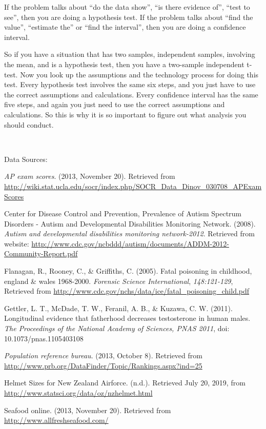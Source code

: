 \documentclass[
]{book}
\begin{document}
If the problem talks about ``do the data show'', ``is there evidence of'', ``test to see'', then you are doing a hypothesis test. If the problem talks about ``find the value'', ``estimate the'' or ``find the interval'', then you are doing a confidence interval.

So if you have a situation that has two samples, independent samples, involving the mean, and is a hypothesis test, then you have a two-sample independent t-test. Now you look up the assumptions and the technology process for doing this test. Every hypothesis test involves the same six steps, and you just have to use the correct assumptions and calculations. Every confidence interval has the same five steps, and again you just need to use the correct assumptions and calculations. So this is why it is so important to figure out what analysis you should conduct.

\textbf{\\
}

Data Sources:

\emph{AP exam scores}. (2013, November 20). Retrieved from
\url{http://wiki.stat.ucla.edu/socr/index.php/SOCR_Data_Dinov_030708_APExamScores}

Center for Disease Control and Prevention, Prevalence of Autism Spectrum
Disorders - Autism and Developmental Disabilities Monitoring Network.
(2008). \emph{Autism and developmental disabilities monitoring network-2012}.
Retrieved from website:
\url{http://www.cdc.gov/ncbddd/autism/documents/ADDM-2012-Community-Report.pdf}

Flanagan, R., Rooney, C., \& Griffiths, C. (2005). Fatal poisoning in
childhood, england \& wales 1968-2000. \emph{Forensic Science International},
\emph{148:121-129}, Retrieved from
\url{http://www.cdc.gov/nchs/data/ice/fatal_poisoning_child.pdf}

Gettler, L. T., McDade, T. W., Feranil, A. B., \& Kuzawa, C. W. (2011).
Longitudinal evidence that fatherhood decreases testosterone in human
males. \emph{The Proceedings of the National Academy of Sciences, PNAS 2011},
doi: 10.1073/pnas.1105403108

\emph{Population reference bureau}. (2013, October 8). Retrieved from
\url{http://www.prb.org/DataFinder/Topic/Rankings.aspx?ind=25}

Helmet Sizes for New Zealand Airforce. (n.d.). Retrieved July 20, 2019, from \url{http://www.statsci.org/data/oz/nzhelmet.html}

Seafood online. (2013, November 20). Retrieved from \url{http://www.allfreshseafood.com/}
\end{document}
